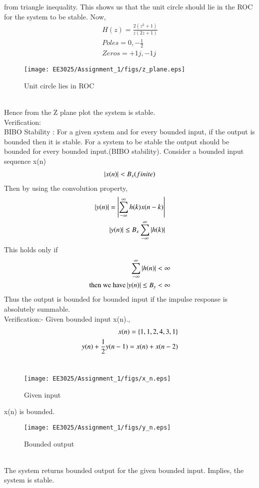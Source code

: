 \documentclass[journal,12pt,twocolumn]{IEEEtran}
\begin{document}
from triangle inequality. This shows us that the unit circle should lie in the ROC for the system to be stable. Now,
\begin{align}
H(z) = \frac{2(z^2+1)}{z(2z+1)} \\
Poles = 0 , -\frac{1}{2} \\
Zeros = +1j, -1j
\end{align}
\begin{figure}[h!]
    \centering
    \texttt{[image: EE3025/Assignment\_1/figs/z\_plane.eps]}
    \caption{Unit circle lies in ROC}
    \label{zn}
\end{figure} \\
Hence from the Z plane plot the system is stable.\\
Verification:\\
BIBO Stability : For a given system and for every bounded input, if the output is bounded then it is stable. 
For a system to be stable the output should be bounded for every bounded input.(BIBO stability).
Consider a bounded input sequence x(n) 
\begin{align}
\left\vert x(n)\right\vert<B_x(finite)
\end{align}
Then by using the convolution property,
\begin{align}
 \left\vert y(n)\right\vert= \left\vert\sum_{-\infty}^{\infty}h(k)x(n-k)\right\vert\\
 \left\vert y(n)\right\vert \leq B_x\sum_{-\infty}^{\infty}\left\vert h(k)\right\vert
\end{align}
 This holds only if
\begin{align}
\sum_{-\infty}^{\infty}\left\vert h(n)\right\vert < 
\infty \\
\text{then we have} \left\vert y(n)\right\vert \leq B_y < \infty 
\end{align}
Thus the output is bounded for bounded input if the impulse response is absolutely summable.\\
Verification:- Given bounded input x(n).,
\begin{align}
x(n) = \left\{1,1,2,4,3,1\right\}\\
y(n)+\frac{1}{2}y(n-1) = x(n)+x(n-2)
\end{align} \\
\begin{figure}[h!]
    \centering
    \texttt{[image: EE3025/Assignment\_1/figs/x\_n.eps]}
    \caption{Given input}
    \label{xn}
\end{figure}
x(n) is bounded.\\
\begin{figure}[h!]
    \centering
    \texttt{[image: EE3025/Assignment\_1/figs/y\_n.eps]}
    \caption{Bounded output}
    \label{yn}
\end{figure} \\
The system returns bounded output for the given bounded input. Implies, the system is stable.\\ 
\end{document}
